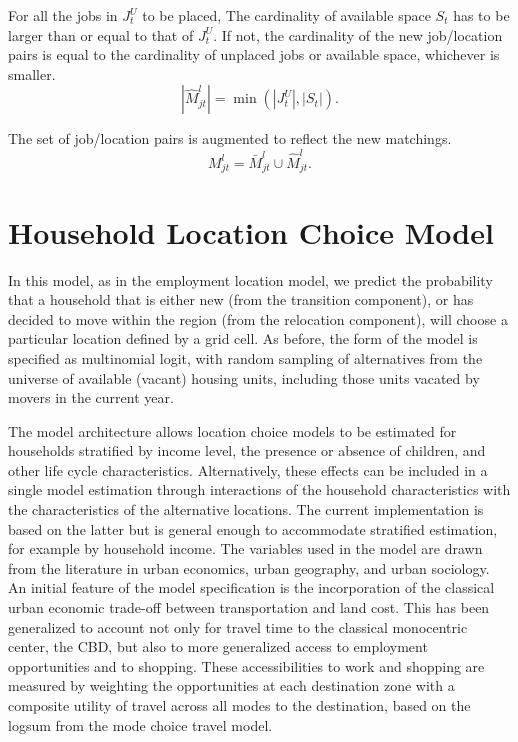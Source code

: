 For all the jobs in $J^U_{t}$ to be placed, The cardinality
of available space $S_{t}$ has to be larger than or equal
to that of $J^U_{t}$.  If not, the cardinality of the new
job/location pairs is equal to the cardinality of unplaced
jobs or available space, whichever is smaller.
\begin{equation}
|\hat{M}^l_{jt}| = \min( |J^U_{t}|, |S_{t}| ).
\end{equation}

The set of job/location pairs is augmented to reflect the new
matchings.
\begin{equation}
M^l_{jt} = \bar{M}^l_{jt} \cup \hat{M}^l_{jt}.
\end{equation}


\section{Household Location Choice Model}

In this model, as in the employment location model, we predict the
probability that a household that is either new (from the
transition component), or has decided to move within the region
(from the relocation component), will choose a particular location
defined by a grid cell.  As before, the form of the model is
specified as multinomial logit, with random sampling of
alternatives from the universe of available (vacant) housing
units, including those units vacated by movers in the current
year.

The model architecture allows location choice models to be
estimated for households stratified by income level, the presence
or absence of children, and other life cycle characteristics.
Alternatively, these effects can be included in a single model
estimation through interactions of the household characteristics
with the characteristics of the alternative locations.  The
current implementation is based on the latter but is general
enough to accommodate stratified estimation, for example by
household income. The variables used in the model are drawn from
the literature in urban economics, urban geography, and urban
sociology.  An initial feature of the model specification is the
incorporation of the classical urban economic trade-off between
transportation and land cost. This has been generalized to account
not only for travel time to the classical monocentric center, the
CBD, but also to more generalized access to employment
opportunities and to shopping. These accessibilities to work and
shopping are measured by weighting the opportunities at each
destination zone with a composite utility of travel across all
modes to the destination, based on the logsum from the mode choice
travel model.

